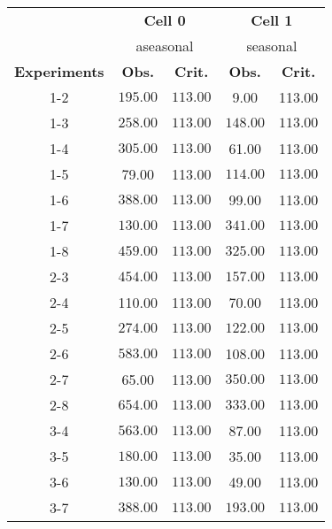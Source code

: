 \begin{table}[ht]
\centering
\begin{tabular*}{\textwidth}{@{\extracolsep{\fill} }ccccc}
  \toprule
& \multicolumn{2}{c}{\textbf{Cell 0}} & \multicolumn{2}{c}{\textbf{Cell 1}} \\
& \multicolumn{2}{c}{aseasonal} & \multicolumn{2}{c}{seasonal} \\
\cmidrule(lr){2-3} \cmidrule(lr){4-5}
\textbf{Experiments} & \textbf{Obs.} & \textbf{Crit.} & \textbf{Obs.} & \textbf{Crit.} \\
  \midrule
1-2 & \(\mathbf{195.00}\) & \(\mathbf{113.00}\) & 9.00 & 113.00 \\ 
  1-3 & \(\mathbf{258.00}\) & \(\mathbf{113.00}\) & \(\mathbf{148.00}\) & \(\mathbf{113.00}\) \\ 
  1-4 & \(\mathbf{305.00}\) & \(\mathbf{113.00}\) & 61.00 & 113.00 \\ 
  1-5 & 79.00 & 113.00 & \(\mathbf{114.00}\) & \(\mathbf{113.00}\) \\ 
  1-6 & \(\mathbf{388.00}\) & \(\mathbf{113.00}\) & 99.00 & 113.00 \\ 
  1-7 & \(\mathbf{130.00}\) & \(\mathbf{113.00}\) & \(\mathbf{341.00}\) & \(\mathbf{113.00}\) \\ 
  1-8 & \(\mathbf{459.00}\) & \(\mathbf{113.00}\) & \(\mathbf{325.00}\) & \(\mathbf{113.00}\) \\ 
   [1ex]2-3 & \(\mathbf{454.00}\) & \(\mathbf{113.00}\) & \(\mathbf{157.00}\) & \(\mathbf{113.00}\) \\ 
  2-4 & 110.00 & 113.00 & 70.00 & 113.00 \\ 
  2-5 & \(\mathbf{274.00}\) & \(\mathbf{113.00}\) & \(\mathbf{122.00}\) & \(\mathbf{113.00}\) \\ 
  2-6 & \(\mathbf{583.00}\) & \(\mathbf{113.00}\) & 108.00 & 113.00 \\ 
  2-7 & 65.00 & 113.00 & \(\mathbf{350.00}\) & \(\mathbf{113.00}\) \\ 
  2-8 & \(\mathbf{654.00}\) & \(\mathbf{113.00}\) & \(\mathbf{333.00}\) & \(\mathbf{113.00}\) \\ 
   [1ex]3-4 & \(\mathbf{563.00}\) & \(\mathbf{113.00}\) & 87.00 & 113.00 \\ 
  3-5 & \(\mathbf{180.00}\) & \(\mathbf{113.00}\) & 35.00 & 113.00 \\ 
  3-6 & \(\mathbf{130.00}\) & \(\mathbf{113.00}\) & 49.00 & 113.00 \\ 
  3-7 & \(\mathbf{388.00}\) & \(\mathbf{113.00}\) & \(\mathbf{193.00}\) & \(\mathbf{113.00}\) \\ 

\end{tabular*}
\end{table}
